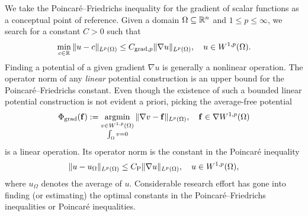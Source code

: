 \documentclass[a4paper]{article}
\begin{document}
We take the Poincar\'e--Friedrichs inequality for the gradient of scalar functions as a conceptual point of reference.
Given a domain $\Omega \subseteq {\mathbb R}^{n}$ and $1 \leq p \leq \infty$,
we search for a constant $C > 0$ such that 
\begin{align*}
    \min\limits_{c\in{\mathbb R}}
    \| u - c \|_{L^{p}(\Omega)}
    \leq 
    C_{\operatorname{grad},p} \| \nabla u \|_{L^p(\Omega)},
    \quad 
    u \in W^{1,p}(\Omega)
    .
\end{align*}
Finding a potential of a given gradient $\nabla u$ is generally a nonlinear operation. 
The operator norm of any \emph{linear} potential construction is an upper bound for the Poincar\'e--Friedrichs constant. 
Even though the existence of such a bounded linear potential construction is not evident a priori, 
picking the average-free potential 
\begin{align*}
    \Phi_{\operatorname{grad}}( {\mathbf f} ) 
    := 
    \operatorname*{{\rm argmin}}\limits_{ \substack{ v \in W^{1,p}(\Omega) \\ \int_\Omega v = 0 } } \| \nabla v - {\mathbf f} \|_{L^{p}(\Omega)},
    \quad 
    {\mathbf f} \in \nabla W^{1,p}(\Omega)
\end{align*}
is a linear operation. Its operator norm is the constant in the Poincar\'e inequality 
\begin{align*}
    \| u - u_{\Omega} \|_{L^{p}(\Omega)}
    \leq 
    C_{\rm P} \| \nabla u \|_{L^p(\Omega)},
    \quad 
    u \in W^{1,p}(\Omega)
    ,
\end{align*}
where $u_\Omega$ denotes the average of $u$.
Considerable research effort has gone into finding (or estimating) the optimal constants in the Poincar\'e--Friedrichs inequalities or Poincar\'e inequalities. 
\end{document}
